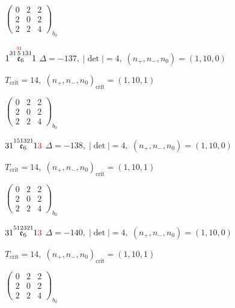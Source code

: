 \documentclass[10pt]{article}
\begin{document}
\hspace{2em}$\left(\begin{smallmatrix}0 & 2 & 2 \\ 2 & 0 & 2 \\ 2 & 2 & 4\end{smallmatrix}\right)_{\!b_0}$

\smallskip

$1\overset{31\overset{\textcolor{red}{3}1}{5}131}{\mathfrak{e}_6}1$ \quad $\Delta=-137,\; |\det|=4,\; (n_+,n_-,n_0)=(1,10,0)$

\hspace{1em}$T_{\text{crit}}=14,\; (n_+,n_-,n_0)_{\text{crit}}=(1,10,1)$

\hspace{2em}$\left(\begin{smallmatrix}0 & 2 & 2 \\ 2 & 0 & 2 \\ 2 & 2 & 4\end{smallmatrix}\right)_{\!b_0}$

\smallskip

$31\overset{151321}{\mathfrak{e}_6}1\textcolor{red}{3}$ \quad $\Delta=-138,\; |\det|=4,\; (n_+,n_-,n_0)=(1,10,0)$

\hspace{1em}$T_{\text{crit}}=14,\; (n_+,n_-,n_0)_{\text{crit}}=(1,10,1)$

\hspace{2em}$\left(\begin{smallmatrix}0 & 2 & 2 \\ 2 & 0 & 2 \\ 2 & 2 & 4\end{smallmatrix}\right)_{\!b_0}$

\smallskip

$31\overset{512321}{\mathfrak{e}_6}1\textcolor{red}{3}$ \quad $\Delta=-140,\; |\det|=4,\; (n_+,n_-,n_0)=(1,10,0)$

\hspace{1em}$T_{\text{crit}}=14,\; (n_+,n_-,n_0)_{\text{crit}}=(1,10,1)$

\hspace{2em}$\left(\begin{smallmatrix}0 & 2 & 2 \\ 2 & 0 & 2 \\ 2 & 2 & 4\end{smallmatrix}\right)_{\!b_0}$
\end{document}
